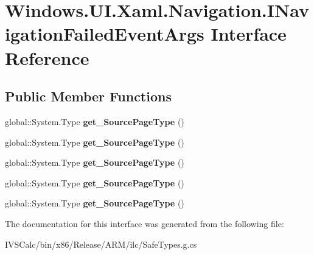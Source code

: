 \hypertarget{interface_windows_1_1_u_i_1_1_xaml_1_1_navigation_1_1_i_navigation_failed_event_args}{}\section{Windows.\+U\+I.\+Xaml.\+Navigation.\+I\+Navigation\+Failed\+Event\+Args Interface Reference}
\label{interface_windows_1_1_u_i_1_1_xaml_1_1_navigation_1_1_i_navigation_failed_event_args}
\subsection*{Public Member Functions}
\begin{DoxyCompactItemize}
\item 
\mbox{\label{interface_windows_1_1_u_i_1_1_xaml_1_1_navigation_1_1_i_navigation_failed_event_args_ac2304650af10488134a7fc70b97244b9}} 
global\+::\+System.\+Type {\bfseries get\+\_\+\+Source\+Page\+Type} ()
\item 
\mbox{\label{interface_windows_1_1_u_i_1_1_xaml_1_1_navigation_1_1_i_navigation_failed_event_args_ac2304650af10488134a7fc70b97244b9}} 
global\+::\+System.\+Type {\bfseries get\+\_\+\+Source\+Page\+Type} ()
\item 
\mbox{\label{interface_windows_1_1_u_i_1_1_xaml_1_1_navigation_1_1_i_navigation_failed_event_args_ac2304650af10488134a7fc70b97244b9}} 
global\+::\+System.\+Type {\bfseries get\+\_\+\+Source\+Page\+Type} ()
\item 
\mbox{\label{interface_windows_1_1_u_i_1_1_xaml_1_1_navigation_1_1_i_navigation_failed_event_args_ac2304650af10488134a7fc70b97244b9}} 
global\+::\+System.\+Type {\bfseries get\+\_\+\+Source\+Page\+Type} ()
\item 
\mbox{\label{interface_windows_1_1_u_i_1_1_xaml_1_1_navigation_1_1_i_navigation_failed_event_args_ac2304650af10488134a7fc70b97244b9}} 
global\+::\+System.\+Type {\bfseries get\+\_\+\+Source\+Page\+Type} ()
\end{DoxyCompactItemize}


The documentation for this interface was generated from the following file\+:\begin{DoxyCompactItemize}
\item 
I\+V\+S\+Calc/bin/x86/\+Release/\+A\+R\+M/ilc/Safe\+Types.\+g.\+cs\end{DoxyCompactItemize}
